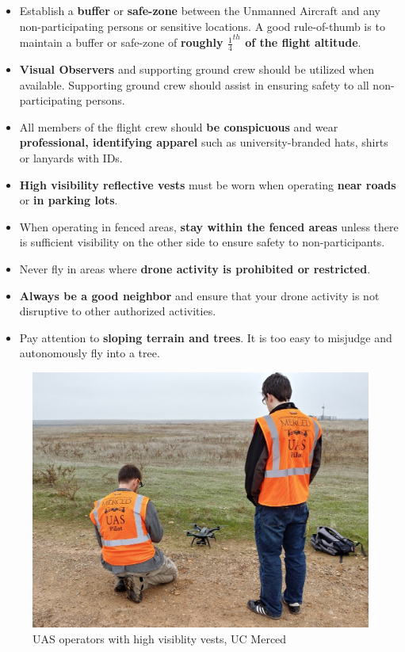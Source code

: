 \documentclass[
  12pt,
]{book}
\providecommand{\tightlist}{%
  \setlength{\itemsep}{0pt}\setlength{\parskip}{0pt}}
\begin{document}
\begin{itemize}
\tightlist
\item
  Establish a \textbf{buffer} or \textbf{safe-zone} between the Unmanned Aircraft and any non-participating persons or sensitive locations. A good rule-of-thumb is to maintain a buffer or safe-zone of \textbf{roughly \(\frac{1}{4}^{th}\) of the flight altitude}.
\item
  \textbf{Visual Observers} and supporting ground crew should be utilized when available. Supporting ground crew should assist in ensuring safety to all non-participating persons.
\item
  All members of the flight crew should \textbf{be conspicuous} and wear \textbf{professional, identifying apparel} such as university-branded hats, shirts or lanyards with IDs.
\item
  \textbf{High visibility reflective vests} must be worn when operating \textbf{near roads} or \textbf{in parking lots}.\\
\item
  When operating in fenced areas, \textbf{stay within the fenced areas} unless there is sufficient visibility on the other side to ensure safety to non-participants.
\item
  Never fly in areas where \textbf{drone activity is prohibited or restricted}.
\item
  \textbf{Always be a good neighbor} and ensure that your drone activity is not disruptive to other authorized activities.
\item
  Pay attention to \textbf{sloping terrain and trees}. It is too easy to misjudge and autonomously fly into a tree.
\end{itemize}

\begin{figure}

{\centering \includegraphics[width=0.75\linewidth]{images/UAS_vest} 

}

\caption{UAS operators with high visiblity vests, UC Merced}\label{fig:hivis}
\end{figure}
\end{document}
